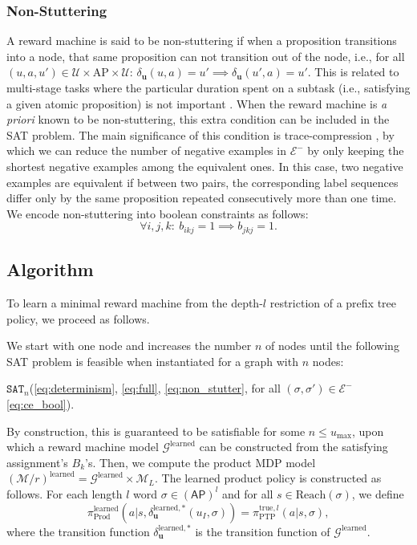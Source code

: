 \documentclass[letterpaper, 10 pt, conference]{ieeeconf}
\begin{document}
\subsubsection{Non-Stuttering}\label{sec:conn}
A reward machine is said to be non-stuttering if when a proposition transitions into a node, that same proposition can not transition out of the node, i.e., for all $(u,a,u')\in\mathcal{U}\times\mathrm{AP}\times\mathcal{U}$: $ \delta_{\mathbf{u}}(u, a) = u' \implies \delta_{\mathbf{u}}(u',a) = u'$. This is related to multi-stage tasks where the particular duration spent on a subtask (i.e., satisfying a given atomic proposition) is not important \cite{baier2008principles}. When the reward machine is \textit{a priori} known to be non-stuttering, this extra condition can be included in the SAT problem. The main significance of this condition is trace-compression \cite{icarte2023learning}, by which we can reduce the number of negative examples in $\mathcal{E}^-$ by only keeping the shortest negative examples among the equivalent ones. In this case, two negative examples are equivalent if between two pairs, the corresponding label sequences differ only by the same proposition repeated consecutively more than one time. 
We encode non-stuttering into boolean constraints as follows:
\begin{equation} \label{eq:non_stutter}
    \forall i,j,k:\ b_{ikj} = 1 \implies b_{jkj} = 1.
\end{equation}


\subsection{Algorithm}\label{sec:algo}

To learn a minimal reward machine from the depth-$l$ restriction of a prefix tree policy, we proceed as follows. 

We start with one node and increases the number $n$ of nodes until the following SAT problem is feasible when instantiated for a graph with $n$ nodes:
\begin{center}
$\texttt{SAT}_n$(\eqref{eq:determinism}, \eqref{eq:full}, \eqref{eq:non_stutter}, for all $(\sigma,\sigma')\in \mathcal{E}^-$  \eqref{eq:ce_bool}).
\end{center}
By construction, this is guaranteed to be satisfiable for some $n\leq u_{\mathrm{max}}$, upon which a reward machine model $\mathcal{G}^{\mathrm{learned}}$ can be constructed from the satisfying assignment's $B_k$'s. Then, we compute the product MDP model $(\mathcal{M}/r)^{\mathrm{learned}}=\mathcal{G}^{\mathrm{learned}} \times \mathcal{M}_L$. The learned product policy is constructed as follows. For each length $l$ word $\sigma\in(\mathsf{AP})^l$ and for all $s \in \mathrm{Reach}(\sigma)$, we define
\begin{equation}\label{eq:const}
\pi_{\mathrm{Prod}}^{\mathrm{learned}}(a|s, \delta_\mathbf{u}^{\mathrm{learned},*}(u_I, \sigma))=\pi_{\mathrm{PTP}}^{\mathrm{true},l}(a|s,\sigma),
\end{equation}
where the transition function $\delta_\mathbf{u}^{\mathrm{learned},*}$ is the transition function of $\mathcal{G}^{\mathrm{learned}}$. 
\end{document}

